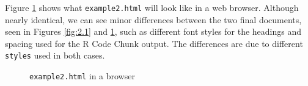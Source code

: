 \documentclass[a4paper, 12pt]{report}
\begin{document}
Figure \ref{fig:3.1} shows what \texttt{example2.html} will look like in a web browser. Although nearly identical, we can see minor differences between the two final documents, seen in Figures \ref{fig:2.1} and \ref{fig:3.1}, such as different font styles for the headings and spacing used for the R Code Chunk output. The differences are due to different \texttt{styles} used in both cases.
\begin{figure}[h!]
\caption{\texttt{example2.html} in a browser}
\label{fig:3.1}
\end{figure}



\pagebreak
\end{document}
